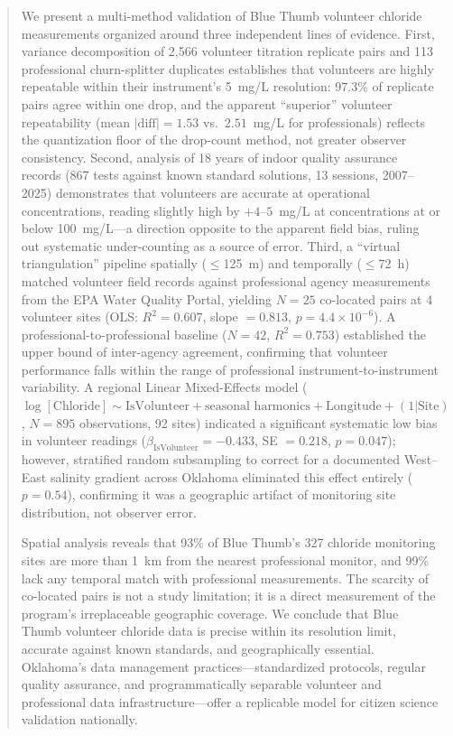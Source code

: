 \documentclass[lineno]{wlpeerj}
\begin{document}
\begin{abstract}
We present a multi-method validation of Blue Thumb volunteer chloride measurements organized around three independent lines of evidence. First, variance decomposition of 2,566 volunteer titration replicate pairs and 113 professional churn-splitter duplicates establishes that volunteers are highly repeatable within their instrument's 5~mg/L resolution: 97.3\% of replicate pairs agree within one drop, and the apparent ``superior'' volunteer repeatability (mean $|\mathrm{diff}| = 1.53$ vs.\ $2.51$~mg/L for professionals) reflects the quantization floor of the drop-count method, not greater observer consistency. Second, analysis of 18 years of indoor quality assurance records (867 tests against known standard solutions, 13 sessions, 2007--2025) demonstrates that volunteers are accurate at operational concentrations, reading slightly high by $+4$--$5$~mg/L at concentrations at or below 100~mg/L---a direction opposite to the apparent field bias, ruling out systematic under-counting as a source of error. Third, a ``virtual triangulation'' pipeline spatially ($\leq$125~m) and temporally ($\leq$72~h) matched volunteer field records against professional agency measurements from the EPA Water Quality Portal, yielding $N=25$ co-located pairs at 4 volunteer sites (OLS: $R^{2} = 0.607$, slope $= 0.813$, $p = 4.4 \times 10^{-6}$). A professional-to-professional baseline ($N=42$, $R^{2} = 0.753$) established the upper bound of inter-agency agreement, confirming that volunteer performance falls within the range of professional instrument-to-instrument variability. A regional Linear Mixed-Effects model ($\log[\mathrm{Chloride}] \sim \mathrm{IsVolunteer} + \text{seasonal harmonics} + \mathrm{Longitude} + (1|\mathrm{Site})$, $N=895$ observations, 92 sites) indicated a significant systematic low bias in volunteer readings ($\beta_{\mathrm{IsVolunteer}} = -0.433$, SE $= 0.218$, $p = 0.047$); however, stratified random subsampling to correct for a documented West--East salinity gradient across Oklahoma \citep{Dyer2025} eliminated this effect entirely ($p = 0.54$), confirming it was a geographic artifact of monitoring site distribution, not observer error.

Spatial analysis reveals that 93\% of Blue Thumb's 327 chloride monitoring sites are more than 1~km from the nearest professional monitor, and 99\% lack any temporal match with professional measurements. The scarcity of co-located pairs is not a study limitation; it is a direct measurement of the program's irreplaceable geographic coverage. We conclude that Blue Thumb volunteer chloride data is precise within its resolution limit, accurate against known standards, and geographically essential. Oklahoma's data management practices---standardized protocols, regular quality assurance, and programmatically separable volunteer and professional data infrastructure---offer a replicable model for citizen science validation nationally.
\end{abstract}
\end{document}
